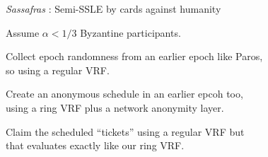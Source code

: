 \documentclass{beamer}
\begin{document}
\begin{frame}[t]

\emph{Sassafras} : Semi-SSLE by cards against humanity \\ \bigskip\bigskip

\hspace{5pt} Assume $\alpha < 1/3$ Byzantine participants. \\ \medskip

\hspace{5pt} Collect epoch randomness from an earlier epoch like Paros, \\ 
\hspace{15pt} so using a regular VRF. \\ \medskip

\hspace{5pt} Create an anonymous schedule in an earlier epcoh too, \\ 
\hspace{15pt} using a ring VRF plus a network anonymity layer. \\ \medskip

\hspace{5pt} Claim the scheduled ``tickets'' using a regular VRF but \\ 
\hspace{15pt} that evaluates exactly like our ring VRF. \\

\end{frame}
\end{document}
